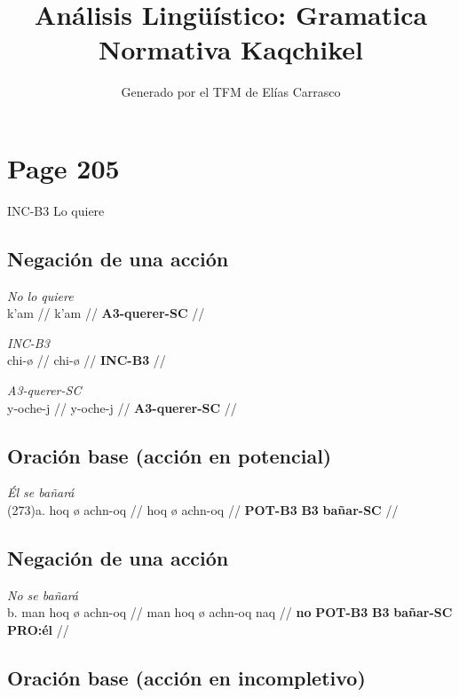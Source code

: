 \documentclass{article}%
\title{Análisis Lingüístico: Gramatica Normativa Kaqchikel}%
\author{Generado por el TFM de Elías Carrasco}%
\begin{document}
%
\normalsize%
\maketitle%
\section{Page 205}%
\label{sec:Page205}%
INC{-}B3 %
Lo quiere %
\subsection{Negación de una acción}%
\label{subsec:Negacindeunaaccin}%

%
\par\medskip%
\ex
\textit{No lo quiere} \\
\begingl
\gla k'am //
\glb k'am //
\glc \textbf{A3-querer-SC} //
\endgl
\xe
%
\medskip%
\par\medskip%
\ex
\textit{INC-B3} \\
\begingl
\gla chi-ø //
\glb chi-ø //
\glc \textbf{INC-}\textbf{B3} //
\endgl
\xe
%
\medskip%
\par\medskip%
\ex
\textit{A3-querer-SC} \\
\begingl
\gla y-oche-j //
\glb y-oche-j //
\glc \textbf{A3-}\textbf{querer-}\textbf{SC} //
\endgl
\xe
%
\medskip%
\subsection{Oración base (acción en potencial)}%
\label{subsec:Oracinbase(accinenpotencial)}%

%
\par\medskip%
\ex
\textit{Él se bañará} \\
\begingl
\gla (273)a. hoq ø achn-oq //
\glb hoq ø achn-oq //
\glc \textbf{POT-B3} \textbf{B3} \textbf{bañar-SC} //
\endgl
\xe
%
\medskip%
\subsection{Negación de una acción}%
\label{subsec:Negacindeunaaccin}%

%
\par\medskip%
\ex
\textit{No se bañará} \\
\begingl
\gla b. man hoq ø achn-oq //
\glb man hoq ø achn-oq naq //
\glc \textbf{no} \textbf{POT-B3} \textbf{B3} \textbf{bañar-SC} \textbf{PRO:él} //
\endgl
\xe
%
\medskip%
\subsection{Oración base (acción en incompletivo)}%
\label{subsec:Oracinbase(accinenincompletivo)}%
\end{document}
